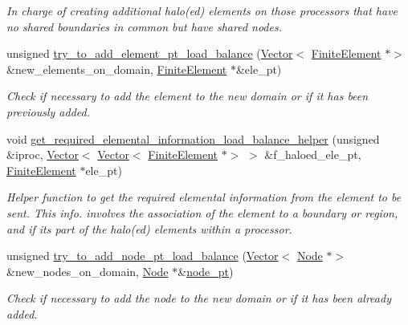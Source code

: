 \begin{DoxyCompactItemize}
\begin{DoxyCompactList}\small\item\em In charge of creating additional halo(ed) elements on those processors that have no shared boundaries in common but have shared nodes. \end{DoxyCompactList}\item 
unsigned \hyperlink{classoomph_1_1RefineableTriangleMesh_ab7a6b91dd228553391d1c666c1e78353}{try\+\_\+to\+\_\+add\+\_\+element\+\_\+pt\+\_\+load\+\_\+balance} (\hyperlink{classoomph_1_1Vector}{Vector}$<$ \hyperlink{classoomph_1_1FiniteElement}{Finite\+Element} $\ast$$>$ \&new\+\_\+elements\+\_\+on\+\_\+domain, \hyperlink{classoomph_1_1FiniteElement}{Finite\+Element} $\ast$\&ele\+\_\+pt)
\begin{DoxyCompactList}\small\item\em Check if necessary to add the element to the new domain or if it has been previously added. \end{DoxyCompactList}\item 
void \hyperlink{classoomph_1_1RefineableTriangleMesh_a83ad5e6390903ae481046c480e02ff65}{get\+\_\+required\+\_\+elemental\+\_\+information\+\_\+load\+\_\+balance\+\_\+helper} (unsigned \&iproc, \hyperlink{classoomph_1_1Vector}{Vector}$<$ \hyperlink{classoomph_1_1Vector}{Vector}$<$ \hyperlink{classoomph_1_1FiniteElement}{Finite\+Element} $\ast$$>$ $>$ \&f\+\_\+haloed\+\_\+ele\+\_\+pt, \hyperlink{classoomph_1_1FiniteElement}{Finite\+Element} $\ast$ele\+\_\+pt)
\begin{DoxyCompactList}\small\item\em Helper function to get the required elemental information from the element to be sent. This info. involves the association of the element to a boundary or region, and if its part of the halo(ed) elements within a processor. \end{DoxyCompactList}\item 
unsigned \hyperlink{classoomph_1_1RefineableTriangleMesh_a74ffc2a74516677536fa41d0c1d957ad}{try\+\_\+to\+\_\+add\+\_\+node\+\_\+pt\+\_\+load\+\_\+balance} (\hyperlink{classoomph_1_1Vector}{Vector}$<$ \hyperlink{classoomph_1_1Node}{Node} $\ast$$>$ \&new\+\_\+nodes\+\_\+on\+\_\+domain, \hyperlink{classoomph_1_1Node}{Node} $\ast$\&\hyperlink{classoomph_1_1Mesh_aebdb699466fe07f2e27aa4404008cde4}{node\+\_\+pt})
\begin{DoxyCompactList}\small\item\em Check if necessary to add the node to the new domain or if it has been already added. \end{DoxyCompactList}\item 
$$
\end{DoxyCompactItemize}
